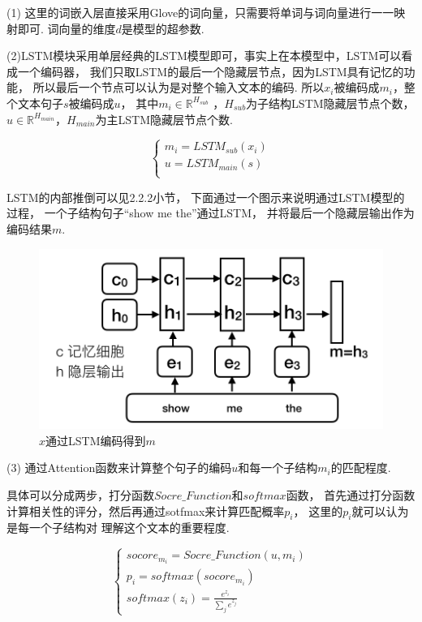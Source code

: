 \documentclass[bachelor,winfonts]{jnuthesis}
\begin{document}
(1) 这里的词嵌入层直接采用Glove的词向量，只需要将单词与词向量进行一一映射即可.
词向量的维度$d$是模型的超参数.

(2)LSTM模块采用单层经典的LSTM模型即可，事实上在本模型中，LSTM可以看成一个编码器，
我们只取LSTM的最后一个隐藏层节点，因为LSTM具有记忆的功能，
所以最后一个节点可以认为是对整个输入文本的编码.
所以$x_{i}$被编码成$m_{i}$，整个文本句子$s$被编码成$u$，
其中$m_{i} \in \mathbb{R}^{H_{sub}}$ ，$H_{sub}$为子结构LSTM隐藏层节点个数，
$u \in \mathbb{R}^{H_{main}}$，$H_{main}$为主LSTM隐藏层节点个数.

\begin{equation}
\left\{
  \begin{array}{l}
   m_{i} = LSTM_{sub}(x_{i}) \\ 
   u = LSTM_{main}(s) \\ 
  \end{array}
  \right.
\end{equation}

LSTM的内部推倒可以见2.2.2小节，
下面通过一个图示来说明通过LSTM模型的过程，
一个子结构句子“show me the”通过LSTM，
并将最后一个隐藏层输出作为编码结果$m$.

\begin{figure}[h!]
  \centering
  \includegraphics[width=0.5\linewidth]{LSTM具体.png}
  \caption{$x$通过LSTM编码得到$m$}
\end{figure}

(3)
通过Attention函数来计算整个句子的编码$u$和每一个子结构$m_{i}$的匹配程度.

具体可以分成两步，打分函数$Socre\_Function$和$softmax$函数，
首先通过打分函数计算相关性的评分，然后再通过sotfmax来计算匹配概率$p_{i}$，
这里的$p_{i}$就可以认为是每一个子结构对
理解这个文本的重要程度.

\begin{equation}
  \left\{
    \begin{array}{l}
     socore_{m_{i}} = Socre\_Function(u,m_{i}) \\ 
     p_{i} = softmax(socore_{m_{i}}) \\ 
     softmax(z_{i}) = \frac{e^{z_{i}}}{\sum_{j} e^{z_{j}}}
    \end{array}
  \right.
\end{equation}
\end{document}
